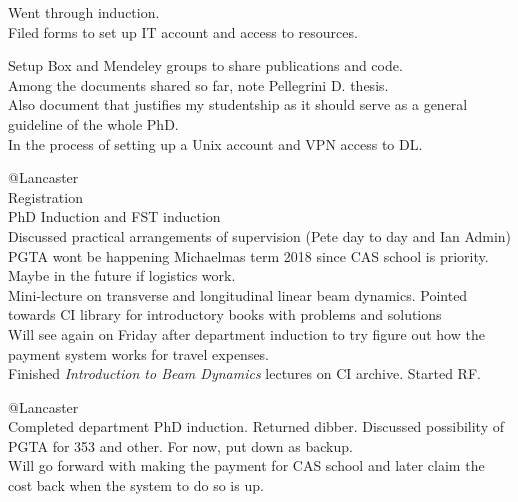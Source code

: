 




Went through induction.\\
Filed forms to set up IT account and access to resources.\\



Setup Box and Mendeley groups to share publications and code.\\
Among the documents shared so far, note Pellegrini D. thesis.\\
Also document that justifies my studentship as it should serve as a general guideline of the whole PhD.\\
In the process of setting up a Unix account and VPN access to DL.\\


@Lancaster\\
Registration\\
PhD Induction and FST induction\\
Discussed practical arrangements of supervision (Pete day to day and Ian Admin)\\
PGTA wont be happening Michaelmas term 2018 since CAS school is priority. Maybe in the future if logistics work.\\
Mini-lecture on transverse and longitudinal linear beam dynamics. Pointed towards CI library for introductory books with problems and solutions\\
Will see again on Friday after department induction to try figure out how the payment system works for travel expenses.\\

Finished \emph{Introduction to Beam Dynamics} lectures on CI archive. Started RF.


@Lancaster\\
Completed department PhD induction. Returned dibber.
Discussed possibility of PGTA for 353 and other. For now, put down as backup.\\
Will go forward with making the payment for CAS school and later claim the cost back when the system to do so is up.\\




